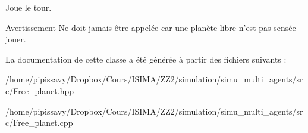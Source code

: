 Joue le tour. 

\begin{DoxyWarning}{Avertissement}
Ne doit jamais être appelée car une planète libre n'est pas sensée jouer. 
\end{DoxyWarning}


La documentation de cette classe a été générée à partir des fichiers suivants \-:\begin{DoxyCompactItemize}
\item 
/home/pipissavy/\-Dropbox/\-Cours/\-I\-S\-I\-M\-A/\-Z\-Z2/simulation/simu\-\_\-multi\-\_\-agents/src/Free\-\_\-planet.\-hpp\item 
/home/pipissavy/\-Dropbox/\-Cours/\-I\-S\-I\-M\-A/\-Z\-Z2/simulation/simu\-\_\-multi\-\_\-agents/src/Free\-\_\-planet.\-cpp\end{DoxyCompactItemize}
